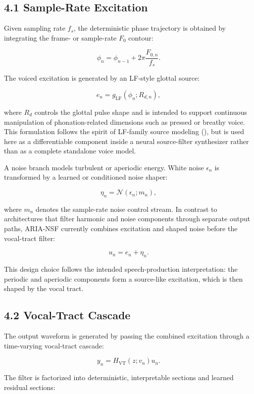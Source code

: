 \subsection{4.1 Sample-Rate Excitation}\label{sample-rate-excitation}

Given sampling rate \(f_s\), the deterministic phase trajectory is
obtained by integrating the frame- or sample-rate \(F_0\) contour:

\[
\phi_n = \phi_{n-1} + 2\pi \frac{F_{0,n}}{f_s}.
\]

The voiced excitation is generated by an LF-style glottal source:

\[
e_n = g_{\mathrm{LF}}(\phi_n; R_{d,n}),
\]

where \(R_d\) controls the glottal pulse shape and is intended to
support continuous manipulation of phonation-related dimensions such as
pressed or breathy voice. This formulation follows the spirit of
LF-family source modeling (),
but is used here as a differentiable component inside a neural
source-filter synthesizer rather than as a complete standalone voice
model.

A noise branch models turbulent or aperiodic energy. White noise
\(\epsilon_n\) is transformed by a learned or conditioned noise shaper:

\[
\eta_n = \mathcal{N}(\epsilon_n; m_n),
\]

where \(m_n\) denotes the sample-rate noise control stream. In contrast
to architectures that filter harmonic and noise components through
separate output paths, ARIA-NSF currently combines excitation and shaped
noise before the vocal-tract filter:

\[
u_n = e_n + \eta_n.
\]

This design choice follows the intended speech-production
interpretation: the periodic and aperiodic components form a source-like
excitation, which is then shaped by the vocal tract.

\subsection{4.2 Vocal-Tract Cascade}\label{vocal-tract-cascade}

The output waveform is generated by passing the combined excitation
through a time-varying vocal-tract cascade:

\[
y_n = H_{\mathrm{VT}}(z; v_n) u_n.
\]

The filter is factorized into deterministic, interpretable sections and
learned residual sections:

